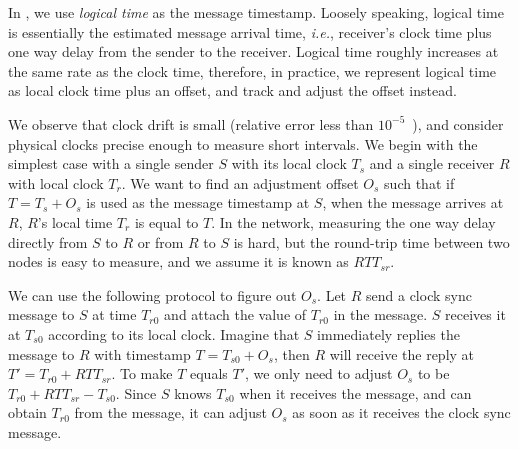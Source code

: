 {In \sys, we use \emph{logical time} as the message timestamp. Loosely speaking, logical time is essentially the estimated message arrival time, \emph{i.e.}, receiver's clock time plus one way delay from the sender to the receiver.
Logical time roughly increases at the same rate as the clock time, therefore, in practice, we represent logical time as local clock time plus an offset, and track and adjust the offset instead.

We observe that clock drift is small (relative error less than $10^{-5}$~\cite{corbett2013spanner,geng2018exploiting}), and consider physical clocks precise enough to measure short intervals. We begin with the simplest case with a single sender $S$ with its local clock $T_s$ and a single receiver $R$ with local clock $T_r$. We want to find an adjustment offset $O_s$ such that if $T = T_s + O_s$ is used as the message timestamp at $S$, when the message arrives at $R$, $R$'s local time $T_r$ is equal to $T$. In the network, measuring the one way delay directly from $S$ to $R$ or from $R$ to $S$ is hard, but the round-trip time between two nodes is easy to measure, and we assume it is known as $RTT_{sr}$.

We can use the following protocol to figure out $O_s$. Let $R$ send a clock sync message to $S$ at time $T_{r0}$ and attach the value of $T_{r0}$ in the message. $S$ receives it at $T_{s0}$ according to its local clock. Imagine that $S$ immediately replies the message to $R$ with timestamp $T = T_{s0} + O_s$, then $R$ will receive the reply at $T' = T_{r0} + RTT_{sr}$. To make $T$ equals $T'$, we only need to adjust $O_s$ to be $T_{r0} + RTT_{sr} - T_{s0}$. Since $S$ knows $T_{s0}$ when it receives the message, and can obtain $T_{r0}$ from the message, it can adjust $O_s$ as soon as it receives the clock sync message.



%

}

